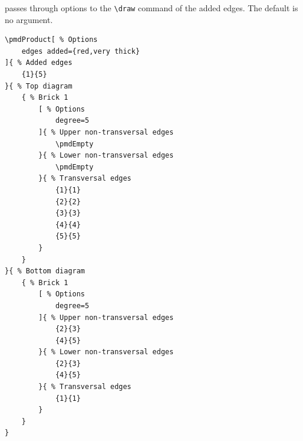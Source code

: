 \documentclass{ltxdoc}
\begin{document}
passes through options to the \verb`\draw` command of the added edges. The default is no argument.
\begin{center}
    \begin{minipage}{\dimexpr0.85\textwidth-2\fboxrule-2\fboxsep\relax}
        \begin{minipage}[c]{0.4\linewidth}
\begin{verbatim}
\pmdProduct[ % Options
    edges added={red,very thick}
]{ % Added edges
    {1}{5}
}{ % Top diagram
    { % Brick 1
        [ % Options
            degree=5
        ]{ % Upper non-transversal edges
            \pmdEmpty
        }{ % Lower non-transversal edges
            \pmdEmpty
        }{ % Transversal edges
            {1}{1}
            {2}{2}
            {3}{3}
            {4}{4}
            {5}{5}
        }
    }
}{ % Bottom diagram
    { % Brick 1
        [ % Options
            degree=5
        ]{ % Upper non-transversal edges
            {2}{3}
            {4}{5}
        }{ % Lower non-transversal edges
            {2}{3}
            {4}{5}
        }{ % Transversal edges
            {1}{1}
        }
    }
}
\end{verbatim}
        \end{minipage}
        \hfill
        \begin{minipage}[c]{0.4\linewidth}
        \end{minipage}
    \end{minipage}%
\end{center}
\begin{center}
\end{center}
\end{document}
